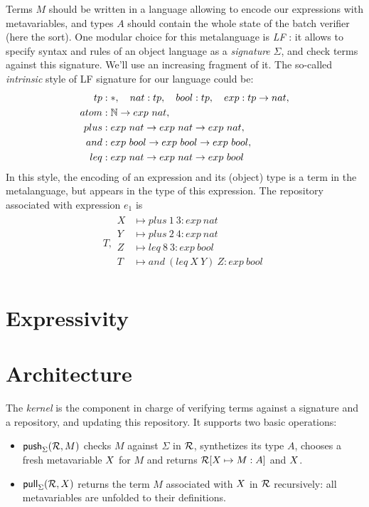 \documentclass[9pt,authoryear]{sigplanconf}
\begin{document}
Terms $M$ should be written in a language allowing to encode our expressions with metavariables,
and types $A$ should contain the whole state of the batch verifier
(here the sort). One modular choice for this metalanguage is \emph{LF}
\cite{harper1993framework}: it allows to specify syntax and rules of
an object language as a \emph{signature} $\Sigma$, and check terms
against this signature. We'll use an increasing fragment of it. The
so-called \emph{intrinsic} style of LF signature for our language
could be:
\begin{align*}
  tp &: \mathsf{*},\quad nat : tp,\quad bool : tp,\quad exp : tp\to nat,\\
  atom &: \mathbb N\to exp\ nat,\\
  plus &: exp\ nat \to exp\ nat \to exp\ nat,\\
  and &: exp\ bool\to exp\ bool\to exp\ bool,\\
  leq &: exp\ nat\to exp\ nat\to exp\ bool
\end{align*}
In this style, the encoding of an expression and its (object) type is
a term in the metalanguage, but appears in the type of this
expression. The repository associated with expression $e_1$ is
\begin{align*}
  T,
  \begin{array}{rl}
  X &\mapsto plus\ 1\ 3 : exp\ nat \\
  Y &\mapsto plus\ 2\ 4 : exp\ nat \\
  Z &\mapsto leq\ 8\ 3 : exp\ bool \\
  T &\mapsto and\ (leq\ X\ Y)\ Z : exp\ bool \\
\end{array}
\end{align*}

\section{Expressivity}



\section{Architecture}

The \emph{kernel} is the component in charge of verifying terms
against a signature and a repository, and updating this repository. It
supports two basic operations:
\begin{itemize}
\item ${\rm\mathsf{push}}_{\Sigma}({\mathcal{R},M})$ checks $M$ against $\Sigma$
  in $\mathcal{R}$, synthetizes its type $A$, chooses a fresh metavariable
  $\mmeta$ for $M$ and returns $\mr[\mmeta\mapsto M:A]$ and $\mmeta$.
\item $\pfunction{pull}\Sigma{\mr, \mmeta}$ returns the term $M$
  associated with $\mmeta$ in $\mathcal{R}$ recursively: all metavariables are
  unfolded to their definitions.
\end{itemize}
\end{document}
